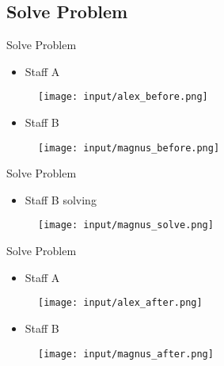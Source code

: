 \subsection{Solve Problem}
\begin{frame}{Solve Problem}
\begin{itemize}
	\item Staff A
\end{itemize}

\begin{figure}[H]
	\centering
		\texttt{[image: input/alex\_before.png]}
	\label{fig:alex_before}
\end{figure}

\begin{itemize}
	\item Staff B
\end{itemize}

\begin{figure}[H]
	\centering
		\texttt{[image: input/magnus\_before.png]}
	\label{fig:magnus_before}
\end{figure}
\end{frame}

\begin{frame}{Solve Problem}
\begin{itemize}
	\item Staff B solving
\end{itemize}
\begin{figure}[H]
	\centering
		\texttt{[image: input/magnus\_solve.png]}
	\label{fig:magnus_solve}
\end{figure}
\end{frame}



\begin{frame}{Solve Problem}
\begin{itemize}
	\item Staff A
\end{itemize}
\begin{figure}[H]
	\centering
		\texttt{[image: input/alex\_after.png]}
	\label{fig:alex_after}
\end{figure}

\begin{itemize}
	\item Staff B
\end{itemize}

\begin{figure}[H]
	\centering
		\texttt{[image: input/magnus\_after.png]}
	\label{fig:magnus_after}
\end{figure}
\end{frame}

